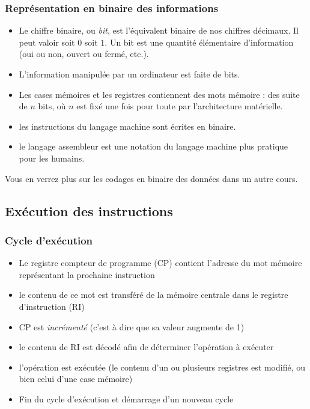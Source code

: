 \documentclass[xcolor=svgnames]{beamer}
\begin{document}
\begin{frame}
  \frametitle{Représentation en binaire des informations}
  \begin{definition}[bit]
    \begin{itemize}
    \item Le chiffre binaire, ou \emph{bit}, est l'équivalent binaire
      de nos chiffres décimaux. Il peut valoir soit $0$ soit $1$. Un
      bit est une \alert{quantité élémentaire d'information} (oui ou non,
      ouvert ou fermé, etc.).\pause
    \item L'information manipulée par un ordinateur est faite de
      bits.\pause
\item Les cases mémoires et les registres contiennent des \alert{mots mémoire}
  : des suite de $n$ bits, où $n$ est fixé une fois pour toute par
  l'architecture matérielle.\pause
\item les instructions du langage machine sont écrites en binaire.\pause
\item   le \alert{langage assembleur} est une notation du langage
  machine plus pratique pour les humains. 
   \end{itemize}
  \end{definition}
\pause Vous en verrez plus sur les codages en binaire des données
dans un autre cours.
\end{frame}

\subsection{Exécution des instructions}
\begin{frame}
  \frametitle{Cycle d'exécution\nowrite}
\pause
\begin{itemize}
  \item Le registre \alert{compteur de programme} (CP) contient l'adresse du mot mémoire
    représentant la prochaine instruction\pause
\item le contenu de ce mot est transféré de la mémoire centrale dans
  le \alert{registre d'instruction} (RI)\pause
\item CP est \emph{incrémenté} (c'est à dire que sa valeur augmente de 1)\pause
\item le contenu de RI est décodé afin de déterminer l'opération à
  exécuter\pause
\item l'opération est exécutée (le contenu d'un ou plusieurs
  registres est modifié, ou bien celui d'une case mémoire)\pause
\item Fin du cycle d'exécution et démarrage d'un nouveau cycle
\end{itemize}
\end{frame}
\end{document}
